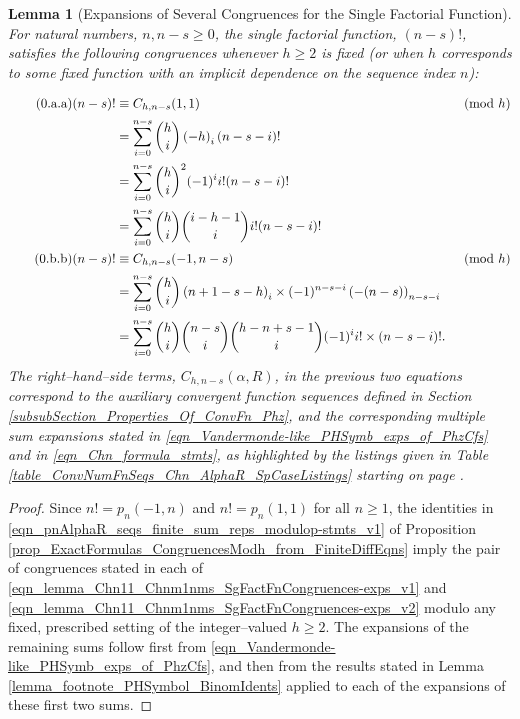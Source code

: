 \documentclass[12pt,reqno]{article}
\renewenvironment{subequations}{%
  \refstepcounter{equation}%
  \edef\theparentequation{\theequation}%
  \setcounter{parentequation}{\value{equation}}%
  \setcounter{equation}{0}%
  \def\theequation{\theparentequation.\alph{equation}}%
  \ignorespaces
}{%
  \setcounter{equation}{\value{parentequation}}%
  \ignorespacesafterend
}
\numberwithin{sfootnote}{section}
\newcommand{\tablerefIII}[2]{Table \ref{#1} starting on page \pageref{#2}}
\numberwithin{equation}{section}
\newcommand{\tagonce}[0]{
     \addtocounter{equation}{1}
     \tag{\theequation}
}
\theoremstyle{plain}
\newtheorem{lemma}[theorem]{Lemma}
\theoremstyle{definition}
\theoremstyle{remark}
\newcommand{\StartGroupingSubEquations}{\begin{subequations}}
\newcommand{\EndGroupingSubEquations}{\end{subequations}}
\newcommand{\Pochhammer}[2]{\ensuremath{\left(#1\right)_{#2}}}
\newcommand{\pn}[3]{\ensuremath{p_{#1}\left(#2, #3\right)}}
\begin{document}
\begin{lemma}[Expansions of Several Congruences for the Single Factorial Function] 
\label{lemma_lm} 
For natural numbers, $n,n-s \geq 0$, the single factorial function, $(n-s)!$, 
satisfies the following congruences 
whenever $h \geq 2$ is fixed (or when $h$ 
corresponds to some fixed function with an implicit dependence on the 
sequence index $n$): 
\StartGroupingSubEquations 
\label{eqn_lemma_Chn11_Chnm1nms_SgFactFnCongruences-exps_subeqns_ref} 
\begin{align*} 
\tagonce\label{eqn_lemma_Chn11_Chnm1nms_SgFactFnCongruences-exps_v1} 
(n-s)! 
     & \equiv 
     C_{h,n-s}(1, 1) && \pmod{h} \\ 
     & = 
     \sum_{i=0}^{n-s} \binom{h}{i} \Pochhammer{-h}{i} (n-s-i)! && \\ 
     & = 
     \sum_{i=0}^{n-s} \binom{h}{i}^{2} (-1)^{i} i! (n-s-i)! && \\ 
     & = 
     \sum_{i=0}^{n-s} \binom{h}{i} \binom{i-h-1}{i} i! (n-s-i)! && \\ 
\tagonce\label{eqn_lemma_Chn11_Chnm1nms_SgFactFnCongruences-exps_v2}  
(n-s)! 
     & \equiv 
     C_{h,n-s}(-1, n-s) && \pmod{h} \\ 
     & = 
     \sum_{i=0}^{n-s} \binom{h}{i} 
     \Pochhammer{n+1-s-h}{i} \times 
     (-1)^{n-s-i} \Pochhammer{-(n-s)}{n-s-i} && \\ 
     & = 
     \sum_{i=0}^{n-s} \binom{h}{i} \binom{n-s}{i} \binom{h-n+s-1}{i} 
     (-1)^{i} i! \times (n-s-i)!. && 
\end{align*} 
\EndGroupingSubEquations 
The right--hand--side terms, $C_{h,n-s}(\alpha, R)$, in the 
previous two equations correspond to the auxiliary convergent function 
sequences defined in 
Section \ref{subsubSection_Properties_Of_ConvFn_Phz}, and the 
corresponding multiple sum expansions stated in 
\eqref{eqn_Vandermonde-like_PHSymb_exps_of_PhzCfs} and in 
\eqref{eqn_Chn_formula_stmts}, 
as highlighted by the listings given in 
\tablerefIII{table_ConvNumFnSeqs_Chn_AlphaR_SpCaseListings}{table_ConvNumFnSeqs_Chn_AlphaR_SpCaseListings-first_subtable_pageref}. 
\end{lemma} 
\begin{proof} 
Since $n! = \pn{n}{-1}{n}$ and $n! = \pn{n}{1}{1}$ for all $n \geq 1$, the 
identities in \eqref{eqn_pnAlphaR_seqs_finite_sum_reps_modulop-stmts_v1} of 
Proposition \ref{prop_ExactFormulas_CongruencesModh_from_FiniteDiffEqns} 
imply the pair of congruences stated in each of 
\eqref{eqn_lemma_Chn11_Chnm1nms_SgFactFnCongruences-exps_v1} and 
\eqref{eqn_lemma_Chn11_Chnm1nms_SgFactFnCongruences-exps_v2} 
modulo any fixed, prescribed setting of the integer--valued $h \geq 2$. 
The expansions of the remaining sums follow first from 
\eqref{eqn_Vandermonde-like_PHSymb_exps_of_PhzCfs}, and then from the 
results stated in 
Lemma \ref{lemma_footnote_PHSymbol_BinomIdents} 
applied to each of the expansions of these first two sums. 
\end{proof} 
\end{document}
